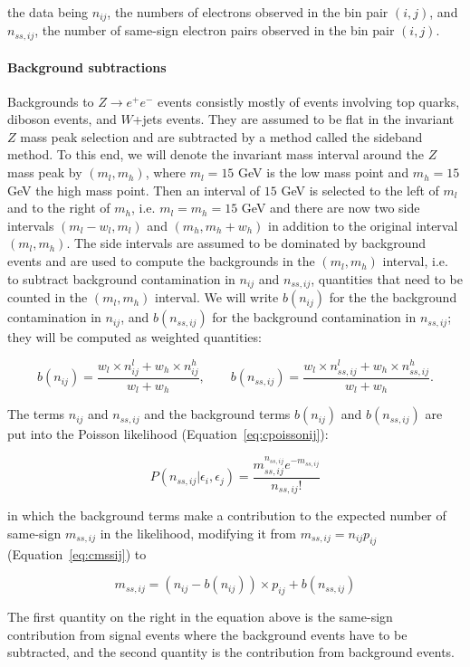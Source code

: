 the data being $n_{ij}$, the numbers of electrons observed in the bin pair
$(i,j)$, and $n_{ss,ij}$, the number of same-sign electron pairs observed in
the bin pair $(i,j)$.

\paragraph{Background subtractions} Backgrounds to $Z\to e^+e^-$ events
consistly mostly of events involving top quarks, diboson events, and $W$+jets
events. They are assumed to be flat in the invariant $Z$ mass peak selection
and are subtracted by a method called the sideband method. To this end, we will
denote the invariant mass interval around the $Z$ mass peak by $(m_l,m_h)$,
where $m_l=15$ GeV is the low mass point and $m_h=15$ GeV the high mass point.
Then an interval of $15$ GeV is selected to the left of $m_l$ and to the right
of $m_h$, i.e. $m_l = m_h = 15$ GeV and there are now two side intervals
$(m_l-w_l, m_l)$ and $(m_h, m_h+w_h)$ in addition to the original interval
$(m_l,m_h)$. The side intervals are assumed to be dominated by background
events and are used to compute the backgrounds in the $(m_l,m_h)$ interval,
i.e. to subtract background contamination in $n_{ij}$ and $n_{ss,ij}$,
quantities that need to be counted in the $(m_l,m_h)$ interval. We will write
$b(n_{ij})$ for the the background contamination in $n_{ij}$, and
$b(n_{ss,ij})$ for the background contamination in $n_{ss,ij}$; they will be
computed as weighted quantities:

$$
	b(n_{ij}) = \frac{w_l\times n_{ij}^l + w_h\times n_{ij}^h}{w_l + w_h}, \qquad
	b(n_{ss,ij})= \frac{w_l\times n_{ss,ij}^l + w_h \times n_{ss,ij}^h }{w_l + w_h}.
$$

The terms $n_{ij}$ and $n_{ss,ij}$ and the background terms $b(n_{ij})$ and
$b(n_{ss,ij})$ are put into the Poisson likelihood (Equation~\ref{eq:cpoissonij}):

$$
	P(n_{ss,ij} | \epsilon_i, \epsilon_j) = \frac{m_{ss,ij}^{n_{ss,ij}} e^{-m_{ss,ij}}}{n_{ss,ij}!}
$$

in which the background terms make a contribution to the expected number of
same-sign $m_{ss,ij}$ in the likelihood, modifying it from $m_{ss,ij} = n_{ij}
	p_{ij}$ (Equation~\ref{eq:cmssij}) to

$$
	m_{ss,ij} = (n_{ij} - b(n_{ij})) \times p_{ij} + b(n_{ss,ij})
$$

The first quantity on the right in the equation above is the same-sign
contribution from signal events where the background events have to be
subtracted, and the second quantity is the contribution from background events.

